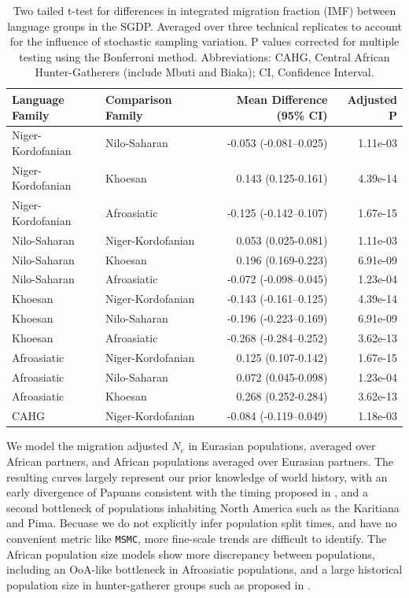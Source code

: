\documentclass{article}
\begin{document}
\begin{table}[ht]
\centering
\begin{tabular}{llrr}
  \hline
Language Family & Comparison Family & Mean Difference (95\% CI) & Adjusted P \\ 
  \hline
Niger-Kordofanian & Nilo-Saharan & -0.053 (-0.081--0.025) & 1.11e-03 \\ 
  Niger-Kordofanian & Khoesan & 0.143 (0.125-0.161) & 4.39e-14 \\ 
  Niger-Kordofanian & Afroasiatic & -0.125 (-0.142--0.107) & 1.67e-15 \\ 
  Nilo-Saharan & Niger-Kordofanian & 0.053 (0.025-0.081) & 1.11e-03 \\ 
  Nilo-Saharan & Khoesan & 0.196 (0.169-0.223) & 6.91e-09 \\ 
  Nilo-Saharan & Afroasiatic & -0.072 (-0.098--0.045) & 1.23e-04 \\ 
  Khoesan & Niger-Kordofanian & -0.143 (-0.161--0.125) & 4.39e-14 \\ 
  Khoesan & Nilo-Saharan & -0.196 (-0.223--0.169) & 6.91e-09 \\ 
  Khoesan & Afroasiatic & -0.268 (-0.284--0.252) & 3.62e-13 \\ 
  Afroasiatic & Niger-Kordofanian & 0.125 (0.107-0.142) & 1.67e-15 \\ 
  Afroasiatic & Nilo-Saharan & 0.072 (0.045-0.098) & 1.23e-04 \\ 
  Afroasiatic & Khoesan & 0.268 (0.252-0.284) & 3.62e-13 \\ 
  CAHG & Niger-Kordofanian & -0.084 (-0.119--0.049) & 1.18e-03 \\ 
   \hline
\end{tabular}
\caption{Two tailed t-test for differences in integrated migration fraction (IMF) between language groups in the SGDP. Averaged over three technical replicates to account for the influence of stochastic sampling variation. P values corrected for multiple testing using the Bonferroni method. Abbreviations: CAHG, Central African Hunter-Gatherers (include Mbuti and Biaka); CI, Confidence Interval.} 
\label{table:sgdp_pairwise}
\end{table}

We model the migration adjusted $N_e$ in Eurasian populations, averaged over African partners, and African populations averaged over Eurasian partners. The resulting curves largely represent our prior knowledge of world history, with an early divergence of Papuans consistent with the timing proposed in \cite{Malaspinas2016}, and a second bottleneck of populations inhabiting North America such as the Karitiana and Pima. Becuase we do not explicitly infer population split times, and have no convenient metric like {\tt MSMC}, more fine-scale trends are difficult to identify. The African population size models show more discrepancy between populations, including an OoA-like bottleneck in Afroasiatic populations, and a large historical population size in hunter-gatherer groups such as proposed in \cite{Lipson2019}. 
\end{document}

